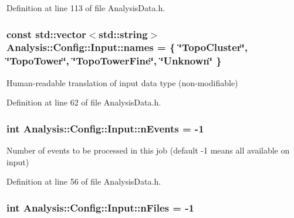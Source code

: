 Definition at line 113 of file Analysis\+Data.\+h.

\subsubsection[{\texorpdfstring{names}{names}}]{\setlength{\rightskip}{0pt plus 5cm}const std\+::vector$<$std\+::string$>$ Analysis\+::\+Config\+::\+Input\+::names = \{ \char`\"{}Topo\+Cluster\char`\"{}, \char`\"{}{\bf Topo\+Tower}\char`\"{}, \char`\"{}{\bf Topo\+Tower\+Fine}\char`\"{}, \char`\"{}{\bf Unknown}\char`\"{} \}\hspace{0.3cm}{\ttfamily [static]}}\hypertarget{namespaceAnalysis_1_1Config_1_1Input_a91cee154e576aa79ee787627d6aca540}{}\label{namespaceAnalysis_1_1Config_1_1Input_a91cee154e576aa79ee787627d6aca540}


Human-\/readable translation of input data type (non-\/modifiable) 



Definition at line 62 of file Analysis\+Data.\+h.

\subsubsection[{\texorpdfstring{n\+Events}{nEvents}}]{\setlength{\rightskip}{0pt plus 5cm}int Analysis\+::\+Config\+::\+Input\+::n\+Events = -\/1\hspace{0.3cm}{\ttfamily [static]}}\hypertarget{namespaceAnalysis_1_1Config_1_1Input_a6b14e2a15595b34711b62b77d22cd759}{}\label{namespaceAnalysis_1_1Config_1_1Input_a6b14e2a15595b34711b62b77d22cd759}


Number of events to be processed in this job (default -\/1 means all available on input) 



Definition at line 56 of file Analysis\+Data.\+h.

\subsubsection[{\texorpdfstring{n\+Files}{nFiles}}]{\setlength{\rightskip}{0pt plus 5cm}int Analysis\+::\+Config\+::\+Input\+::n\+Files = -\/1\hspace{0.3cm}{\ttfamily [static]}}\hypertarget{namespaceAnalysis_1_1Config_1_1Input_a3b76605b518ed07f9f6984fb80f40039}{}\label{namespaceAnalysis_1_1Config_1_1Input_a3b76605b518ed07f9f6984fb80f40039}


